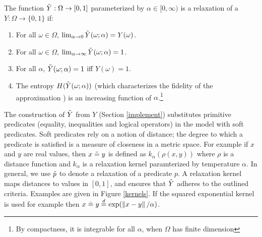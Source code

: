 
\begin{definition}
The function $\tilde{Y} : \Omega \to [0, 1]$ parameterized by $\alpha \in [0, \infty)$ is a relaxation of a $Y: \Omega \to \{0, 1\}$ if:
\begin{enumerate}[label=(\roman*)]
	\label{def:temp}
	\item For all $\omega \in \Omega$, $\lim_{\alpha \to 0}\tilde{Y}(\omega; \alpha) = Y(\omega)$.
	\item For all $\omega \in \Omega$, $\lim_{\alpha \to \infty}\tilde{Y}(\omega; \alpha) = 1$.

    \item For all $\alpha$, $\tilde{Y}(\omega; \alpha) = 1$ iff $Y(\omega) = 1$.
    \item The entropy $H(\tilde{Y}(\omega; \alpha))$ (which characterizes the fidelity of the approximation ) is an increasing function of $\alpha$.\footnote
    {By compactness, it is integrable for all $\alpha$, when $\Omega$ has finite dimension}
\end{enumerate}
\end{definition}


The construction of $\tilde{Y}$ from $Y$ (Section \ref{implement}) substitutes primitive predicates (equality, inequalities and logical operators) in the model with soft predicates.  Soft predicates rely on a notion of distance; the degree to which a predicate is satisfied is a measure of closeness in a metric space. 
For example if $x$ and $y$ are real values, then $x \mathrel{\tilde{=}} y$ is defined as $k_\alpha(\rho(x, y))$ where $\rho$ is a distance function and $k_\alpha$ is a relaxation kernel paramterized by temperature $\alpha$.
In general, we use $\mathrel{\tilde{p}}$ to denote a relaxation of a predicate $p$.
A relaxation kernel maps distances to values in $[0, 1]$, and ensures that $\tilde{Y}$ adheres to the outlined criteria.
Examples are given in Figure \ref{kernels}.
If the squared exponential kernel is used for example then $x \mathrel{\tilde{=}} y \stackrel {d}{=} \exp(\left\|{{x - y}}\right\|/\alpha)$.

